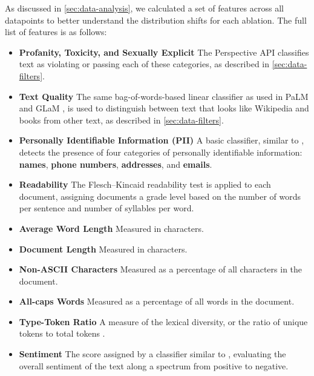 \documentclass{article}
\begin{document}
As discussed in \cref{sec:data-analysis}, we calculated a set of features across all datapoints to better understand the distribution shifts for each ablation. The full list of features is as follows:
\begin{itemize}
    \item \textbf{Profanity, Toxicity, and Sexually Explicit} The Perspective API classifies text as violating or passing each of these categories, as described in \cref{sec:data-filters}.
    \item \textbf{Text Quality} The same bag-of-words-based linear classifier as used in PaLM \citep{chowdhery2022palm} and GLaM \citep{du_glam_2021}, is used to distinguish between text that looks like Wikipedia and books from other text, as described in \cref{sec:data-filters}.
    \item \textbf{Personally Identifiable Information (PII)} A basic classifier, similar to \citet{gcloud_info}, detects the presence of four categories of personally identifiable information: \textbf{names}, \textbf{phone numbers}, \textbf{addresses}, and \textbf{emails}.
    \item \textbf{Readability} The Flesch–Kincaid readability test \citep{kincaid1975derivation} is applied to each document, assigning documents a grade level based on the number of words per sentence and number of syllables per word.
    \item \textbf{Average Word Length} Measured in characters.
    \item \textbf{Document Length} Measured in characters.
    \item  \textbf{Non-ASCII Characters} Measured as a percentage of all characters in the document.
    \item \textbf{All-caps Words} Measured as a percentage of all words in the document.
    \item \textbf{Type-Token Ratio} A measure of the lexical diversity, or the ratio of unique tokens to total tokens \citep{bender2013linguistic}.
    \item \textbf{Sentiment} The score assigned by a classifier similar to \citet{gcloud_sentiment}, evaluating the overall sentiment of the text along a spectrum from positive to negative.
\end{itemize}
\end{document}
